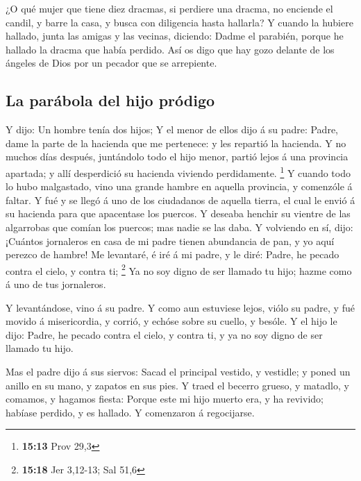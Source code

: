  ¿O qué mujer que tiene diez dracmas, si perdiere una
dracma, no enciende el candil, y barre la casa, y busca con diligencia
hasta hallarla?  Y cuando la hubiere hallado, junta las
amigas y las vecinas, diciendo: Dadme el parabién, porque he hallado la
dracma que había perdido.  Así os digo que hay gozo
delante de los ángeles de Dios por un pecador que se arrepiente.

\hypertarget{la-paruxe1bola-del-hijo-pruxf3digo}{%
\subsection{La parábola del hijo
pródigo}\label{la-paruxe1bola-del-hijo-pruxf3digo}}

 Y dijo: Un hombre tenía dos hijos;  Y el
menor de ellos dijo á su padre: Padre, dame la parte de la hacienda que
me pertenece: y les repartió la hacienda.  Y no muchos
días después, juntándolo todo el hijo menor, partió lejos á una
provincia apartada; y allí desperdició su hacienda viviendo
perdidamente. \footnote{\textbf{15:13} Prov 29,3}  Y
cuando todo lo hubo malgastado, vino una grande hambre en aquella
provincia, y comenzóle á faltar.  Y fué y se llegó á uno
de los ciudadanos de aquella tierra, el cual le envió á su hacienda para
que apacentase los puercos.  Y deseaba henchir su vientre
de las algarrobas que comían los puercos; mas nadie se las daba.
 Y volviendo en sí, dijo: ¡Cuántos jornaleros en casa de
mi padre tienen abundancia de pan, y yo aquí perezco de hambre!
 Me levantaré, é iré á mi padre, y le diré: Padre, he
pecado contra el cielo, y contra ti; \footnote{\textbf{15:18} Jer
  3,12-13; Sal 51,6}  Ya no soy digno de ser llamado tu
hijo; hazme como á uno de tus jornaleros.

 Y levantándose, vino á su padre. Y como aun estuviese
lejos, viólo su padre, y fué movido á misericordia, y corrió, y echóse
sobre su cuello, y besóle.  Y el hijo le dijo: Padre, he
pecado contra el cielo, y contra ti, y ya no soy digno de ser llamado tu
hijo.

 Mas el padre dijo á sus siervos: Sacad el principal
vestido, y vestidle; y poned un anillo en su mano, y zapatos en sus
pies.  Y traed el becerro grueso, y matadlo, y comamos, y
hagamos fiesta:  Porque este mi hijo muerto era, y ha
revivido; habíase perdido, y es hallado. Y comenzaron á regocijarse.

